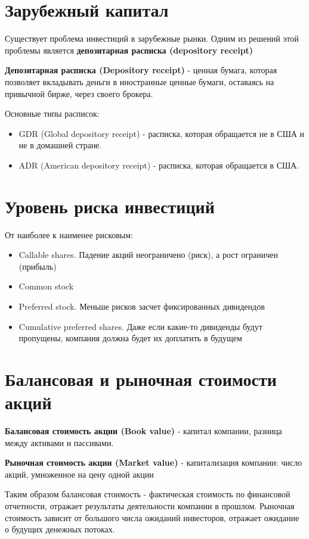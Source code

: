 \documentclass{article}
\begin{document}
\section{Зарубежный капитал}

Существует проблема инвестиций в зарубежные рынки. Одним из решений этой проблемы является \textbf{депозитарная расписка (depository receipt)} 

\textbf{Депозитарная расписка (Depository receipt)} - ценная бумага, которая позволяет вкладывать деньги в иностранные ценные бумаги, оставаясь на привычной бирже, через своего брокера.

Основные типы расписок:
\begin{itemize}
     \item GDR (Global depository receipt) - расписка, которая обращается не в США и не в домашней стране. 
     \item ADR (American depository receipt) - расписка, которая обращается в США. 
\end{itemize}



\section{Уровень риска инвестиций}
От наиболее к наименее рисковым:
\begin{itemize}
     \item Callable shares. Падение акций неограничено (риск), а рост ограничен (прибыль)
     \item Common stock 
     \item Preferred stock. Меньше рисков засчет фиксированных дивидендов
     \item Cumulative preferred shares. Даже если какие-то дивиденды будут пропущены, компания должна будет их доплатить в будущем 
\end{itemize}


\section{Балансовая и рыночная стоимости акций}

\textbf{Балансовая стоимость акции (Book value)} - капитал компании, разница между активами и пассивами.

\textbf{Рыночная стоимость акции (Market value)} - капитализация компании: число акций, умноженное на цену одной акции

Таким образом балансовая стоимость - фактическая стоимость по финансовой отчетности, отражает результаты деятельности компании в прошлом. Рыночная стоимость зависит от большого числа ожиданий инвесторов, отражает ожидание о будущих денежных потоках.
\end{document}
